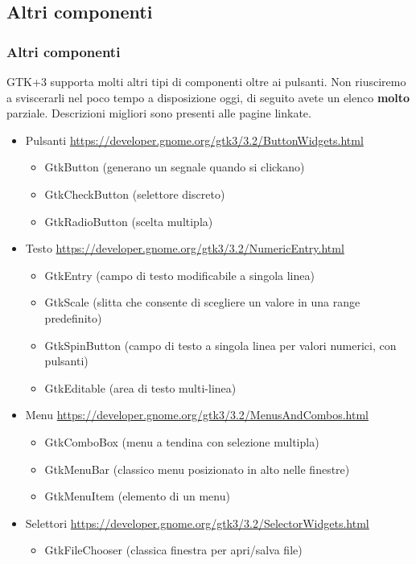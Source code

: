 \documentclass{beamer}
\begin{document}
\subsection{Altri componenti}

\begin{frame}
\frametitle{Altri componenti}
GTK+3 supporta molti altri tipi di componenti oltre ai pulsanti. Non riusciremo a sviscerarli nel poco tempo a disposizione oggi, di seguito avete un elenco \textbf{molto} parziale. Descrizioni migliori sono presenti alle pagine linkate.
\begin{itemize}
 \scriptsize
 \item Pulsanti \url{https://developer.gnome.org/gtk3/3.2/ButtonWidgets.html}
 \begin{itemize}
 \tiny
  \item GtkButton (generano un segnale quando si clickano)
  \item GtkCheckButton (selettore discreto)
  \item GtkRadioButton (scelta multipla)
 \end{itemize}
 \scriptsize
 \item Testo \url{https://developer.gnome.org/gtk3/3.2/NumericEntry.html}
 \begin{itemize}
 \tiny
  \item GtkEntry (campo di testo modificabile a singola linea)
  \item GtkScale (slitta che consente di scegliere un valore in una range predefinito)
  \item GtkSpinButton (campo di testo a singola linea per valori numerici, con pulsanti)
  \item GtkEditable (area di testo multi-linea)
 \end{itemize}
 \scriptsize
 \item Menu \url{https://developer.gnome.org/gtk3/3.2/MenusAndCombos.html}
 \begin{itemize}
 \tiny
  \item GtkComboBox (menu a tendina con selezione multipla)
  \item GtkMenuBar (classico menu posizionato in alto nelle finestre)
  \item GtkMenuItem  (elemento di un menu)
 \end{itemize}
 \scriptsize
 \item Selettori \url{https://developer.gnome.org/gtk3/3.2/SelectorWidgets.html}
 \begin{itemize}
 \tiny
  \item GtkFileChooser (classica finestra per apri/salva file)

\end{itemize}
\end{itemize}
\end{frame}
\end{document}
